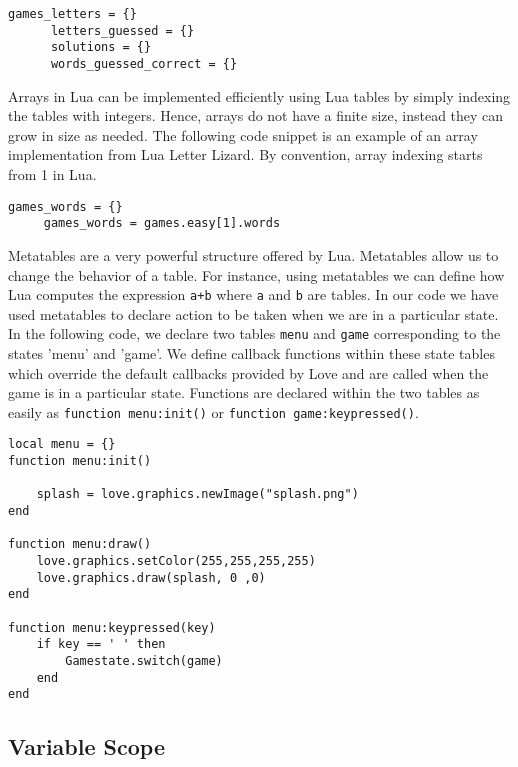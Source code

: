 \begin{lstlisting}[language={[5.2]Lua},caption= Declaring tables in Letter lizard]
	  games_letters = {}
	  letters_guessed = {}
	  solutions = {}
	  words_guessed_correct = {}
\end{lstlisting}

Arrays in Lua can be implemented efficiently using Lua tables by simply indexing the tables with integers. Hence, arrays do not have a finite size, instead they can grow in size as needed. The following code snippet is an example of an array implementation from Lua Letter Lizard. By convention, array indexing starts from 1 in Lua.

\begin{lstlisting}[language={[5.2]Lua},caption= An array structure which holds pre-generated game puzzles easily accessed by indexing the table]
	 games_words = {}
     games_words = games.easy[1].words
\end{lstlisting}

Metatables are a very powerful structure offered by Lua. Metatables allow us to change the behavior of a table. For instance, using metatables we can define how Lua computes the expression \texttt{a+b} where \texttt{a} and \texttt{b} are tables. In our code we have used metatables to declare action to be taken when we are in a particular state. In the following code, we declare two tables \texttt{menu} and \texttt{game} corresponding to the states 'menu' and 'game'. We define callback functions within these state tables which override the default callbacks provided by Love and are called when the game is in a particular state. Functions are declared within the two tables as easily as \texttt{function menu:init()} or \texttt{function game:keypressed()}.

\begin{lstlisting}[language={[5.2]Lua},caption= Declaring and initializing metatables in Lua]
local menu = {}
function menu:init()

    splash = love.graphics.newImage("splash.png")
end

function menu:draw()
    love.graphics.setColor(255,255,255,255)
    love.graphics.draw(splash, 0 ,0)
end

function menu:keypressed(key)
    if key == ' ' then
        Gamestate.switch(game)
    end
end
\end{lstlisting}



\subsection{Variable Scope}
\label{varscope}

